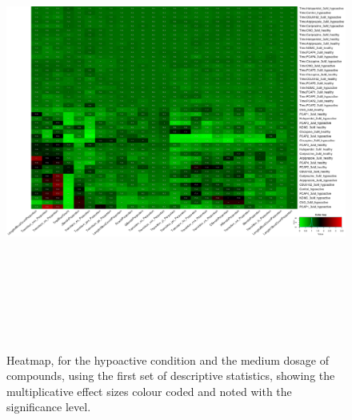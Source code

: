 \documentclass[a4paper,12pt]{article}
\begin{document}
\begin{figure}[h!]
\begin{center}
\includegraphics[width=16cm,height=15cm]{DarkApoLow_heatmap_3_microM_DarkApoLow_B2MAP.png}
\caption{Heatmap, for the hypoactive condition and the medium dosage of compounds, using the first set of descriptive statistics, showing the multiplicative effect sizes colour coded and noted with the significance level.}
\end{center}
\end{figure}
\newpage
\end{document}

